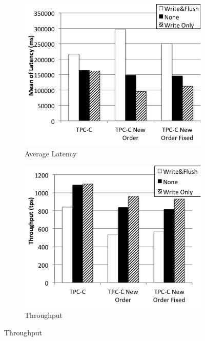 \begin{figure}
    \centering
    \begin{subfigure}[t]{0.24\textwidth}
        \includegraphics[width=\textwidth]{plots/log_flush/latency}
        \caption{Average Latency}
        \label{fig:commit-mean}
    \end{subfigure}
    \begin{subfigure}[t]{0.24\textwidth}
        \includegraphics[width=\textwidth]{plots/log_flush/throughput}
        \caption{Throughput}
        \label{fig:commit-throughput}
    \end{subfigure}

\end{figure}

